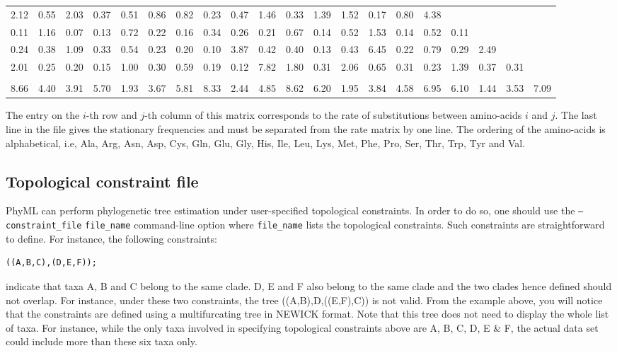\documentclass[a4paper,12pt]{article}
\newcommand{\x}[1]{\texttt{#1}}
\begin{document}
\begin{center}
{\begin{tabular}{p{0.33cm}p{0.33cm}p{0.33cm}p{0.33cm}p{0.33cm}p{0.33cm}p{0.33cm}p{0.33cm}p{0.33cm}p{0.33cm}p{0.33cm}p{0.33cm}p{0.33cm}p{0.33cm}p{0.33cm}p{0.33cm}p{0.33cm}p{0.33cm}p{0.33cm}p{0.33cm}}
2.12 & 0.55 & 2.03 & 0.37 & 0.51 & 0.86 & 0.82 & 0.23 & 0.47 & 1.46 & 0.33 & 1.39 & 1.52 & 0.17 & 0.80 & 4.38 &  &&& \\
0.11 & 1.16 & 0.07 & 0.13 & 0.72 & 0.22 & 0.16 & 0.34 & 0.26 & 0.21 & 0.67 & 0.14 & 0.52 & 1.53 & 0.14 & 0.52 & 0.11 &  && \\
0.24 & 0.38 & 1.09 & 0.33 & 0.54 & 0.23 & 0.20 & 0.10 & 3.87 & 0.42 & 0.40 & 0.13 & 0.43 & 6.45 & 0.22 & 0.79 & 0.29 & 2.49 &   & \\
2.01 & 0.25 & 0.20 & 0.15 & 1.00 & 0.30 & 0.59 & 0.19 & 0.12 & 7.82 & 1.80 & 0.31 & 2.06 & 0.65 & 0.31 & 0.23 & 1.39 & 0.37 & 0.31 &   \\
\\
8.66 & 4.40 & 3.91 & 5.70 & 1.93 & 3.67 & 5.81 & 8.33 & 2.44 & 4.85 & 8.62 & 6.20 & 1.95 & 3.84 & 4.58 & 6.95 & 6.10 & 1.44 & 3.53 & 7.09  \\
\end{tabular}
}
\end{center}

The  entry  on the  $i$-th  row  and  $j$-th  column of  this  matrix  corresponds  to the  rate  of
substitutions between  amino-acids $i$  and $j$.   The last line  in the  file gives  the stationary
frequencies and must be separated from the rate  matrix by one line. The ordering of the amino-acids
is alphabetical,  i.e, Ala, Arg, Asn, Asp,  Cys, Gln, Glu, Gly,  His, Ile, Leu, Lys,  Met, Phe, Pro,
Ser, Thr, Trp, Tyr and Val.


\subsection{Topological constraint file}\label{sec:topoconstraints}

PhyML can perform phylogenetic tree estimation under user-specified topological constraints. In
order to do so, one should use the \x{--constraint\_file}  \x{file\_name} command-line option where 
\x{file\_name} lists the topological constraints. Such constraints are  straightforward to
define. For instance, the following constraints: 
\vspace{0.2cm}
\begin{Verbatim}
((A,B,C),(D,E,F));
\end{Verbatim} 
indicate that taxa A, B and C belong to the same clade. D, E and F also belong to the
same  clade and the  two clades  hence defined  should not  overlap. For  instance, under  these two
constraints, the tree ((A,B),D,((E,F),C)) is not valid. From the example above, you will notice that
the constraints are defined  using a multifurcating tree in NEWICK format.  Note that this tree does
not need to display the whole list of taxa. For instance, while the only taxa involved in specifying
topological constraints above  are A, B, C, D, E  \& F, the actual data set  could include more than
these six taxa only.
\end{document}
